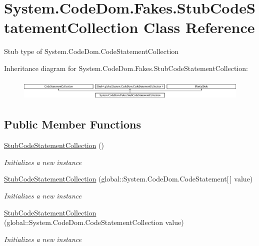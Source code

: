 \hypertarget{class_system_1_1_code_dom_1_1_fakes_1_1_stub_code_statement_collection}{\section{System.\-Code\-Dom.\-Fakes.\-Stub\-Code\-Statement\-Collection Class Reference}
\label{class_system_1_1_code_dom_1_1_fakes_1_1_stub_code_statement_collection}
}


Stub type of System.\-Code\-Dom.\-Code\-Statement\-Collection 


Inheritance diagram for System.\-Code\-Dom.\-Fakes.\-Stub\-Code\-Statement\-Collection\-:\begin{figure}[H]
\begin{center}
\leavevmode
\includegraphics[height=1.057601cm]{class_system_1_1_code_dom_1_1_fakes_1_1_stub_code_statement_collection}
\end{center}
\end{figure}
\subsection*{Public Member Functions}
\begin{DoxyCompactItemize}
\item 
\hyperlink{class_system_1_1_code_dom_1_1_fakes_1_1_stub_code_statement_collection_aabb66427b16b06126775ea2f3b417e65}{Stub\-Code\-Statement\-Collection} ()
\begin{DoxyCompactList}\small\item\em Initializes a new instance\end{DoxyCompactList}\item 
\hyperlink{class_system_1_1_code_dom_1_1_fakes_1_1_stub_code_statement_collection_a040801c22728686ffeaa73826fd06ad1}{Stub\-Code\-Statement\-Collection} (global\-::\-System.\-Code\-Dom.\-Code\-Statement\mbox{[}$\,$\mbox{]} value)
\begin{DoxyCompactList}\small\item\em Initializes a new instance\end{DoxyCompactList}\item 
\hyperlink{class_system_1_1_code_dom_1_1_fakes_1_1_stub_code_statement_collection_a6e113ab308ff87d08889b8cb1e5c4ffe}{Stub\-Code\-Statement\-Collection} (global\-::\-System.\-Code\-Dom.\-Code\-Statement\-Collection value)
\begin{DoxyCompactList}\small\item\em Initializes a new instance\end{DoxyCompactList}\end{DoxyCompactItemize}
